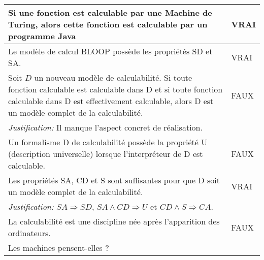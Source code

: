 \begin{longtable}{p{13cm}|l}
    Si une fonction est calculable par une Machine de Turing, alors cette fonction est calculable par un programme Java& VRAI \\
    \hline
    Le modèle de calcul BLOOP possède les propriétés SD et SA.& VRAI \\
    \hline
    Soit $D$ un nouveau modèle de calculabilité. Si toute fonction calculable est calculable dans D et si toute fonction calculable dans D est effectivement calculable, alors D est un modèle complet de la calculabilité.& FAUX\\
    \textit{Justification:} Il manque l'aspect concret de réalisation. & \\
    \hline
    Un formalisme D de calculabilité possède la propriété U (description universelle) lorsque l'interpréteur de D est calculable.& FAUX \\
    \hline
    Les propriétés SA, CD et S sont suffisantes pour que D soit un modèle complet de la calculabilité. & VRAI \\
    \textit{Justification:} $SA \Rightarrow SD$, $SA \land CD \Rightarrow U$ et $CD \land S \Rightarrow CA$. & \\
    \hline
    La calculabilité est une discipline née après l'apparition des ordinateurs. & FAUX \\
    \hline
    Les machines pensent-elles ?& \\
    \hline
\end{longtable}